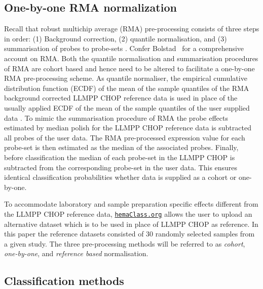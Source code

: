 \documentclass[twocolumn]{bmcart}%
\newcommand{\hemaClass}{\href{http://hemaClass.org}{\texttt{hemaClass.org}}}
\begin{document}
\subsection{One-by-one RMA normalization}
Recall that robust multichip average (RMA) pre-processing consists of three steps in order:
(1) Background correction,
(2) quantile normalisation, and
(3) summarisation of probes to probe-sets \cite{Irizarry2003}.
Confer Bolstad~\cite{Bolstad2004} for a comprehensive account on RMA.
Both the quantile normalisation and summarisation procedures of RMA are cohort based and hence need to be altered to facilitate a one-by-one RMA pre-processing scheme.
As quantile normaliser, the empirical cumulative distribution function (ECDF) of the mean of the sample quantiles of the RMA background corrected LLMPP CHOP reference data is used in place of the usually applied ECDF of the mean of the sample quantiles of the user supplied data \cite{Bolstad2003}.
To mimic the summarisation procedure of RMA \cite{Irizarry2003b} the probe effects estimated by median polish for the LLMPP CHOP reference data is subtracted all probes of the user data.
The RMA pre-processed expression value for each probe-set is then estimated as the median of the associated probes.
Finally, before classification the median of each probe-set in the LLMPP CHOP is subtracted from the corresponding probe-set in the user data.
This ensures identical classification probabilities whether data is supplied as a cohort or one-by-one.

To accommodate laboratory and sample preparation specific effects different from the LLMPP CHOP reference data, \hemaClass{} allows the user to upload an alternative dataset which is to be used in place of LLMPP CHOP as reference.
In this paper the reference datasets consisted of $30$ randomly selected samples from a given study.
The three pre-processing methods will be referred to as \emph{cohort}, \emph{one-by-one}, and \emph{reference based} normalisation.



\subsection{Classification methods}
\end{document}
